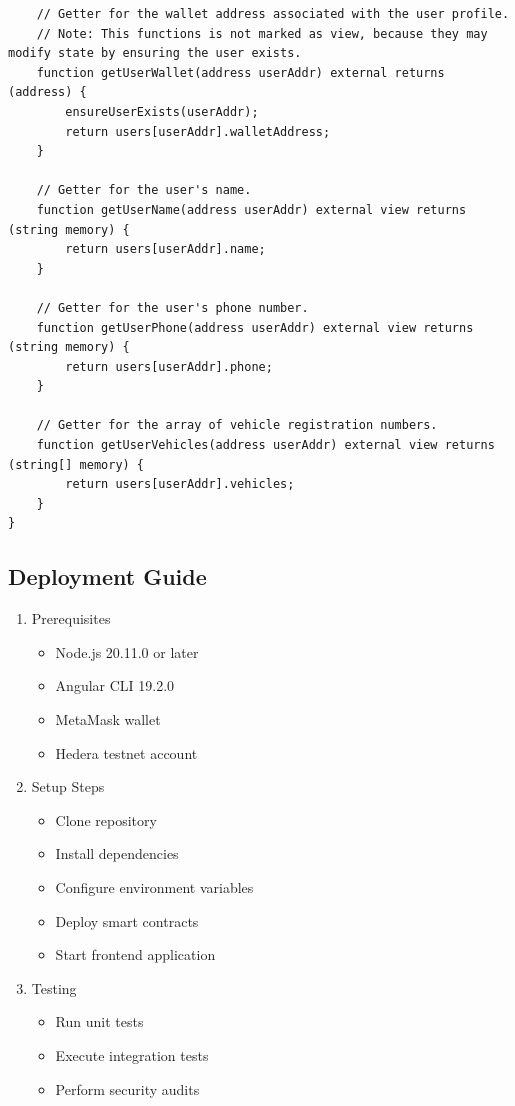 \documentclass[12pt,a4paper]{article}
\begin{document}
\begin{verbatim}
    // Getter for the wallet address associated with the user profile.
    // Note: This functions is not marked as view, because they may modify state by ensuring the user exists.
    function getUserWallet(address userAddr) external returns (address) {
        ensureUserExists(userAddr);
        return users[userAddr].walletAddress;
    }

    // Getter for the user's name.
    function getUserName(address userAddr) external view returns (string memory) {
        return users[userAddr].name;
    }

    // Getter for the user's phone number.
    function getUserPhone(address userAddr) external view returns (string memory) {
        return users[userAddr].phone;
    }

    // Getter for the array of vehicle registration numbers.
    function getUserVehicles(address userAddr) external view returns (string[] memory) {
        return users[userAddr].vehicles;
    }
}
    \end{verbatim}

    \subsection{Deployment Guide}
    \begin{enumerate}
        \item Prerequisites
        \begin{itemize}
            \item Node.js 20.11.0 or later
            \item Angular CLI 19.2.0
            \item MetaMask wallet
            \item Hedera testnet account
        \end{itemize}

        \item Setup Steps
        \begin{itemize}
            \item Clone repository
            \item Install dependencies
            \item Configure environment variables
            \item Deploy smart contracts
            \item Start frontend application
        \end{itemize}

        \item Testing
        \begin{itemize}
            \item Run unit tests
            \item Execute integration tests
            \item Perform security audits
        \end{itemize}
    \end{enumerate}
\end{document}
